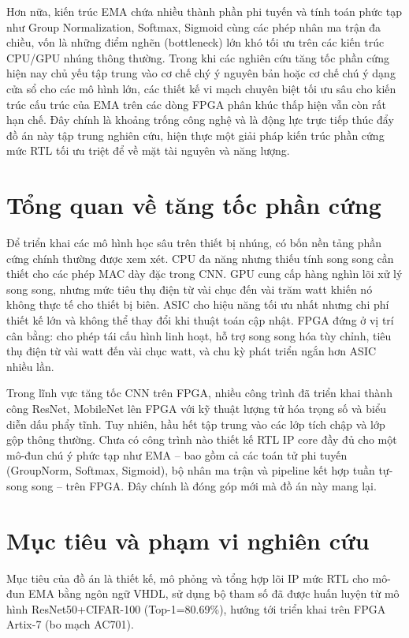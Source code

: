 \documentclass{uetgraduation}
\begin{document}
Hơn nữa, kiến trúc EMA chứa nhiều thành phần phi tuyến và tính toán phức tạp như Group Normalization, Softmax, Sigmoid cùng các phép nhân ma trận đa chiều, vốn là những điểm nghẽn (bottleneck) lớn khó tối ưu trên các kiến trúc CPU/GPU nhúng thông thường. Trong khi các nghiên cứu tăng tốc phần cứng hiện nay chủ yếu tập trung vào cơ chế chý ý nguyên bản hoặc cơ chế chú ý dạng cửa sổ cho các mô hình lớn, các thiết kế vi mạch chuyên biệt tối ưu sâu cho kiến trúc cấu trúc của EMA trên các dòng FPGA phân khúc thấp hiện vẫn còn rất hạn chế. Đây chính là khoảng trống công nghệ và là động lực trực tiếp thúc đẩy đồ án này tập trung nghiên cứu, hiện thực một giải pháp kiến trúc phần cứng mức RTL tối ưu triệt để về mặt tài nguyên và năng lượng.

\section{Tổng quan về tăng tốc phần cứng}
Để triển khai các mô hình học sâu trên thiết bị nhúng, có bốn nền tảng phần cứng
chính thường được xem xét. CPU đa năng nhưng thiếu tính song song cần thiết cho
các phép MAC dày đặc trong CNN. GPU cung cấp hàng nghìn lõi xử lý song song,
nhưng mức tiêu thụ điện từ vài chục đến vài trăm watt khiến nó không thực tế cho
thiết bị biên. ASIC cho hiệu năng tối ưu nhất nhưng chi phí thiết kế lớn và không
thể thay đổi khi thuật toán cập nhật. FPGA đứng ở vị trí cân bằng: cho phép tái
cấu hình linh hoạt, hỗ trợ song song hóa tùy chỉnh, tiêu thụ điện từ vài watt
đến vài chục watt, và chu kỳ phát triển ngắn hơn ASIC nhiều lần.

Trong lĩnh vực tăng tốc CNN trên FPGA, nhiều công trình đã triển khai thành công
ResNet, MobileNet lên FPGA với kỹ thuật lượng tử hóa trọng số và biểu diễn dấu phẩy tĩnh.
Tuy nhiên, hầu hết tập trung vào các lớp tích chập và lớp gộp thông thường. Chưa
có công trình nào thiết kế RTL IP core đầy đủ cho một mô-đun chú ý phức tạp
như EMA -- bao gồm cả các toán tử phi tuyến (GroupNorm, Softmax, Sigmoid), bộ nhân
ma trận và pipeline kết hợp tuần tự-song song -- trên FPGA. Đây chính là đóng góp
mới mà đồ án này mang lại.

\section{Mục tiêu và phạm vi nghiên cứu}
Mục tiêu của đồ án là thiết kế, mô phỏng và tổng hợp lõi IP mức RTL cho
mô-đun EMA bằng ngôn ngữ VHDL, sử dụng bộ tham số đã được huấn luyện từ mô hình
ResNet50+CIFAR-100 (Top-1=80.69\%), hướng tới triển khai trên FPGA Artix-7
(bo mạch AC701).
\end{document}
